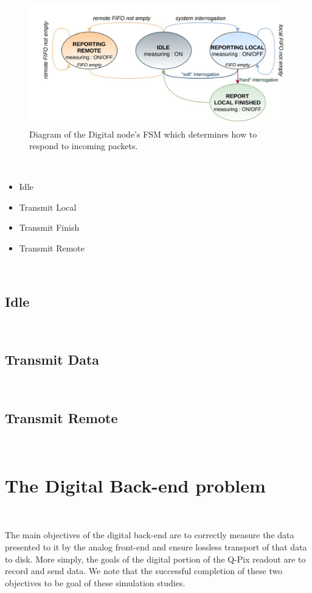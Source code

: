\begin{figure}[]
\centering
\includegraphics[width=\textwidth]{images/digital_fsm_overview.jpg}
\caption{Diagram of the Digital node's FSM which determines how to respond to incoming packets.}
\end{figure}~\label{fig:digital_fsm}

\begin{itemize}
    \item Idle
    \item Transmit Local
    \item Transmit Finish
    \item Transmit Remote
\end{itemize}~\label{fsm_state_labels}

\subsection{Idle}~\label{sec:state_idle}

\subsection{Transmit Data}~\label{sec:state_data}

\subsection{Transmit Remote}~\label{sec:state_remote}

\section{The Digital Back-end problem}~\label{sec:digital_problem}

The main objectives of the digital back-end are to correctly measure the data presented to it by the analog front-end and ensure lossless transport of that data to disk.
More simply, the goals of the digital portion of the Q-Pix readout are to record and send data.
We note that the successful completion of these two objectives to be goal of these simulation studies.

